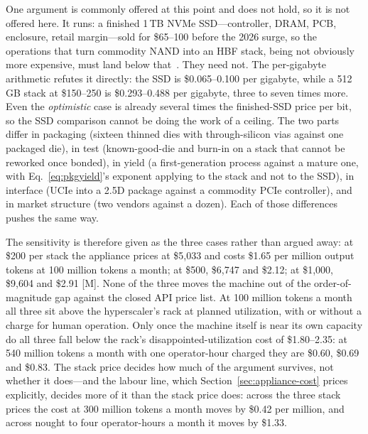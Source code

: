 One argument is commonly offered at this point and does not hold, so it is not offered here. It runs: a finished 1\,TB NVMe SSD---controller, DRAM, PCB, enclosure, retail margin---sold for \$65--100 before the 2026 surge, so the operations that turn commodity NAND into an HBF stack, being not obviously more expensive, must land below that~\cite{nvme-presurge}. They need not. The per-gigabyte arithmetic refutes it directly: the SSD is \$0.065--0.100 per gigabyte, while a 512\,GB stack at \$150--250 is \$0.293--0.488 per gigabyte, three to seven times more. Even the \emph{optimistic} case is already several times the finished-SSD price per bit, so the SSD comparison cannot be doing the work of a ceiling. The two parts differ in packaging (sixteen thinned dies with through-silicon vias against one packaged die), in test (known-good-die and burn-in on a stack that cannot be reworked once bonded), in yield (a first-generation process against a mature one, with Eq.~\eqref{eq:pkgyield}'s exponent applying to the stack and not to the SSD), in interface (UCIe into a 2.5D package against a commodity PCIe controller), and in market structure (two vendors against a dozen). Each of those differences pushes the same way.

The sensitivity is therefore given as the three cases rather than argued away: at \$200 per stack the appliance prices at \$5,033 and costs \$1.65 per million output tokens at 100 million tokens a month; at \$500, \$6,747 and \$2.12; at \$1,000, \$9,604 and \$2.91 [M]. None of the three moves the machine out of the order-of-magnitude gap against the closed API price list. At 100 million tokens a month all three sit above the hyperscaler's rack at planned utilization, with or without a charge for human operation. Only once the machine itself is near its own capacity do all three fall below the rack's disappointed-utilization cost of \$1.80--2.35: at 540 million tokens a month with one operator-hour charged they are \$0.60, \$0.69 and \$0.83. The stack price decides how much of the argument survives, not whether it does---and the labour line, which Section~\ref{sec:appliance-cost} prices explicitly, decides more of it than the stack price does: across the three stack prices the cost at 300 million tokens a month moves by \$0.42 per million, and across nought to four operator-hours a month it moves by \$1.33.

